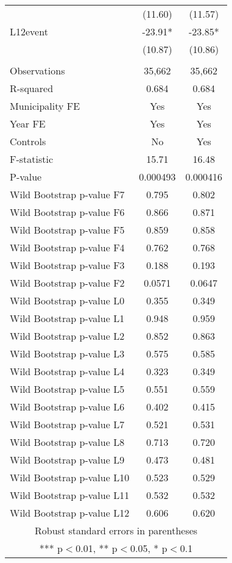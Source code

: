 \documentclass[]{article}
\begin{document}
\begin{tabular}{lcc}
 & (11.60) & (11.57) \\
L12event & -23.91* & -23.85* \\
 & (10.87) & (10.86) \\
 &  &  \\
Observations & 35,662 & 35,662 \\
R-squared & 0.684 & 0.684 \\
Municipality FE & Yes & Yes \\
Year FE & Yes & Yes \\
Controls & No & Yes \\
F-statistic & 15.71 & 16.48 \\
P-value & 0.000493 & 0.000416 \\
Wild Bootstrap p-value F7 & 0.795 & 0.802 \\
Wild Bootstrap p-value F6 & 0.866 & 0.871 \\
Wild Bootstrap p-value F5 & 0.859 & 0.858 \\
Wild Bootstrap p-value F4 & 0.762 & 0.768 \\
Wild Bootstrap p-value F3 & 0.188 & 0.193 \\
Wild Bootstrap p-value F2 & 0.0571 & 0.0647 \\
Wild Bootstrap p-value L0 & 0.355 & 0.349 \\
Wild Bootstrap p-value L1 & 0.948 & 0.959 \\
Wild Bootstrap p-value L2 & 0.852 & 0.863 \\
Wild Bootstrap p-value L3 & 0.575 & 0.585 \\
Wild Bootstrap p-value L4 & 0.323 & 0.349 \\
Wild Bootstrap p-value L5 & 0.551 & 0.559 \\
Wild Bootstrap p-value L6 & 0.402 & 0.415 \\
Wild Bootstrap p-value L7 & 0.521 & 0.531 \\
Wild Bootstrap p-value L8 & 0.713 & 0.720 \\
Wild Bootstrap p-value L9 & 0.473 & 0.481 \\
Wild Bootstrap p-value L10 & 0.523 & 0.529 \\
Wild Bootstrap p-value L11 & 0.532 & 0.532 \\
 Wild Bootstrap p-value L12 & 0.606 & 0.620 \\ \hline
\multicolumn{3}{c}{ Robust standard errors in parentheses} \\
\multicolumn{3}{c}{ *** p$<$0.01, ** p$<$0.05, * p$<$0.1} \\
\end{tabular}
\end{document}
